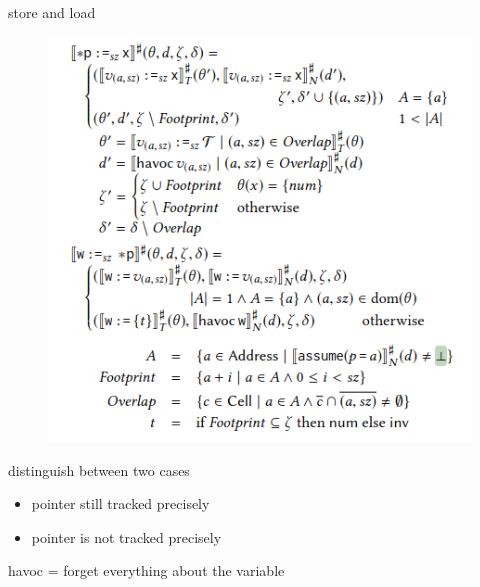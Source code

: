 \documentclass[aspectratio=169]{beamer}
\begin{document}
\begin{frame}{store and load}
  \noindent
  \begin{minipage}{0.55\textwidth}
    \begin{figure}
      \centering
      \includegraphics[width=\textwidth]{loadstore.png}
    \end{figure}
  \end{minipage}
  \begin{minipage}{0.40\textwidth}
    distinguish between two cases
    \begin{itemize}
      \item pointer still tracked precisely
      \item pointer is not tracked precisely
    \end{itemize}
    havoc = forget everything about the variable

  \end{minipage}
\end{frame}
\end{document}
